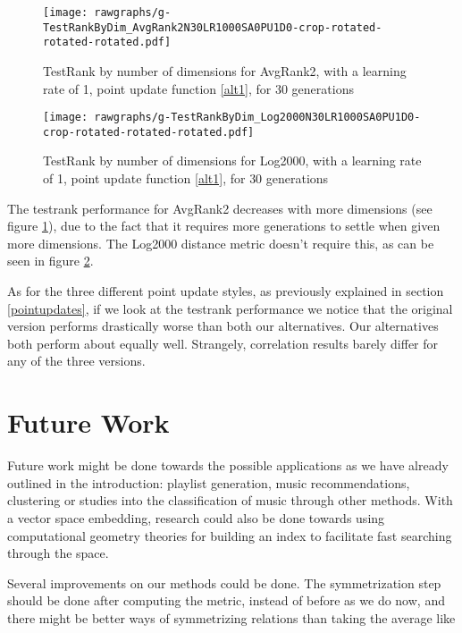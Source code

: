 \documentclass[10pt,fleqn,a4paper]{article}
\begin{document}
\begin{twocolumn}
\begin{figure}
\begin{center}\texttt{[image: rawgraphs/g-TestRankByDim\_AvgRank2N30LR1000SA0PU1D0-crop-rotated-rotated-rotated.pdf]}\end{center}
    \caption{TestRank by number of dimensions for AvgRank2, with a learning rate of 1, point update function \ref{alt1}, for $30$ generations}
    \label{testrankbydim-avgrank2}
\end{figure}

\begin{figure}
\begin{center}\texttt{[image: rawgraphs/g-TestRankByDim\_Log2000N30LR1000SA0PU1D0-crop-rotated-rotated-rotated.pdf]}\end{center}
    \caption{TestRank by number of dimensions for Log2000, with a learning rate of 1, point update function \ref{alt1}, for $30$ generations}
    \label{testrankbydim-log2000}
\end{figure}

The testrank performance for AvgRank2 decreases with more dimensions (see figure \ref{testrankbydim-avgrank2}), due to the fact that it requires more generations to settle when given more dimensions. The Log2000 distance metric doesn't require this, as can be seen in figure \ref{testrankbydim-log2000}.

As for the three different point update styles, as previously explained in section \ref{pointupdates}, if we look at the testrank performance we notice that the original version performs drastically worse than both our alternatives. Our alternatives both perform about equally well. Strangely, correlation results barely differ for any of the three versions.


\section{Future Work}

Future work might be done towards the possible applications as we have already outlined in the introduction: playlist generation, music recommendations, clustering or studies into the classification of music through other methods. With a vector space embedding, research could also be done towards using computational geometry theories for building an index to facilitate fast searching through the space.

Several improvements on our methods could be done. The symmetrization step should be done after computing the metric, instead of before as we do now, and there might be better ways of symmetrizing relations than taking the average like we do now - for example by using the maximum. Also, there may be smart ways of fixing the triangle inequality violations we have in the data set, rather than simply shortening the longest edge implicitly with Dijkstra's. This is especially important for the (poorly performing) AvgRank distance metric, as over half of the triangles are erroneous in that case.


\end{twocolumn}
\end{document}

